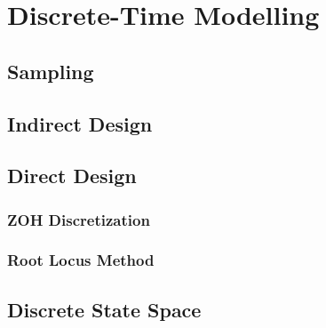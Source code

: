 
\section{Discrete-Time Modelling}

\subsection{Sampling}

\subsection{Indirect Design}

\subsection{Direct Design}

\subsubsection{ZOH Discretization}

\subsubsection{Root Locus Method}

\subsection{Discrete State Space}
